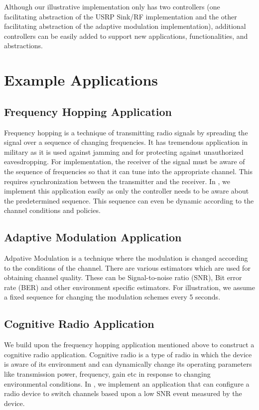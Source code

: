 Although our illustrative implementation only has two controllers (one facilitating abstraction of the USRP Sink/RF implementation and the other facilitating abstraction of the adaptive modulation implementation), additional controllers can be easily added to support new applications, functionalities, and abstractions.

\section{Example Applications}


\subsection{Frequency Hopping Application}
Frequency hopping is a technique of transmitting radio signals by spreading the signal over a sequence of changing frequencies. It has tremendous application in military as it is used against jamming and for protecting against unauthorized eavesdropping. For implementation, the receiver of the signal must be aware of the sequence of frequencies so that it can tune into the appropriate channel. This requires synchronization between the transmitter and the receiver. In \crossflow, we implement this application easily as only the controller needs to be aware about the predetermined sequence. This sequence can even be dynamic according to the channel conditions and policies.   

\subsection{Adaptive Modulation Application}
Adpative Modulation is a technique where the modulation is changed according to the conditions of the channel. There are various estimators which are used for obtaining channel quality. These can be Signal-to-noise ratio (SNR), Bit error rate (BER) and other environment specific estimators. For illustration, we assume a fixed sequence for changing the modulation schemes every 5 seconds. 

\subsection{Cognitive Radio Application}
We build upon the frequency hopping application mentioned above to construct a cognitive radio application. Cognitive radio is a type of radio in which the device is aware of its environment and can dynamically change its operating parameters like transmission power, frequency, gain etc in response to changing environmental conditions. In \crossflow, we implement an application that can configure a radio device to switch channels based upon a low SNR event measured by the device.
